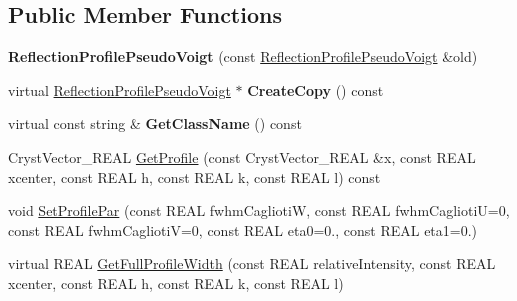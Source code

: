 \subsection*{Public Member Functions}
\begin{DoxyCompactItemize}
\item 
\mbox{\label{class_obj_cryst_1_1_reflection_profile_pseudo_voigt_a00e4ab294a17b1cf082567eccad9807f}} 
{\bfseries Reflection\+Profile\+Pseudo\+Voigt} (const \mbox{\hyperlink{class_obj_cryst_1_1_reflection_profile_pseudo_voigt}{Reflection\+Profile\+Pseudo\+Voigt}} \&old)
\item 
\mbox{\label{class_obj_cryst_1_1_reflection_profile_pseudo_voigt_aa8479276d168db5d052f1a6ad80ffdb8}} 
virtual \mbox{\hyperlink{class_obj_cryst_1_1_reflection_profile_pseudo_voigt}{Reflection\+Profile\+Pseudo\+Voigt}} $\ast$ {\bfseries Create\+Copy} () const
\item 
\mbox{\label{class_obj_cryst_1_1_reflection_profile_pseudo_voigt_a25a7d114337210841706f733698ab539}} 
virtual const string \& {\bfseries Get\+Class\+Name} () const
\item 
Cryst\+Vector\+\_\+\+R\+E\+AL \mbox{\hyperlink{class_obj_cryst_1_1_reflection_profile_pseudo_voigt_aa8a7489c58c10252c977de54e0aa6292}{Get\+Profile}} (const Cryst\+Vector\+\_\+\+R\+E\+AL \&x, const R\+E\+AL xcenter, const R\+E\+AL h, const R\+E\+AL k, const R\+E\+AL l) const
\item 
void \mbox{\hyperlink{class_obj_cryst_1_1_reflection_profile_pseudo_voigt_a41d53cb9c852d564d06c5ccb3ddfbcca}{Set\+Profile\+Par}} (const R\+E\+AL fwhm\+CagliotiW, const R\+E\+AL fwhm\+CagliotiU=0, const R\+E\+AL fwhm\+CagliotiV=0, const R\+E\+AL eta0=0., const R\+E\+AL eta1=0.)
\item 
virtual R\+E\+AL \mbox{\hyperlink{class_obj_cryst_1_1_reflection_profile_pseudo_voigt_aab311ae897daf5e738eb7727e57fd0c7}{Get\+Full\+Profile\+Width}} (const R\+E\+AL relative\+Intensity, const R\+E\+AL xcenter, const R\+E\+AL h, const R\+E\+AL k, const R\+E\+AL l)
\item 
\mbox{\label{class_obj_cryst_1_1_reflection_profile_pseudo_voigt_acc84f44528014542fa395352edad6079}} 

\end{DoxyCompactItemize}

